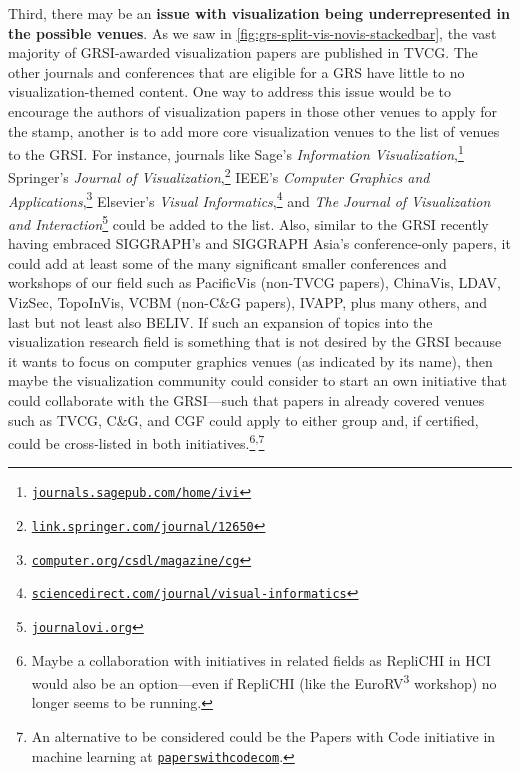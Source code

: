 \documentclass[conference,svgnames]{vgtc}                     %
\begin{document}
Third, there may be an \textbf{issue with visualization being underrepresented in the possible venues}. As we saw in \autoref{fig:grs-split-vis-novis-stackedbar}, the vast majority of GRSI-awarded visualization papers are published in TVCG. The other journals and conferences that are eligible for a GRS have little to no visualization-themed content. One way to address this issue would be to encourage the authors of visualization papers in those other venues to apply for the stamp, another is to add more core visualization venues to the list of venues to the GRSI. For instance, journals like Sage's \emph{Information Visualization},\footnote{\href{https://journals.sagepub.com/home/ivi}{\texttt{journals.sagepub.com/home/ivi}}} Springer's \emph{Journal of Visualization},\footnote{\href{https://link.springer.com/journal/12650}{\texttt{link.springer.com/journal/12650}}} IEEE's \emph{Computer Graphics and Applications},\footnote{\href{https://www.computer.org/csdl/magazine/cg}{\texttt{computer.org/csdl/magazine/cg}}} Elsevier's \emph{Visual Informatics},\footnote{\href{https://www.sciencedirect.com/journal/visual-informatics}{\texttt{sciencedirect.com/journal/visual-informatics}}} and \emph{The Journal of Visualization and Interaction}\footnote{\href{https://www.journalovi.org/}{\texttt{journalovi.org}}} could be added to the list. Also, similar to the GRSI recently having embraced SIGGRAPH's and SIGGRAPH Asia's conference-only papers, it could add at least some of the many significant smaller conferences and workshops of our field such as PacificVis (non-TVCG papers), ChinaVis, LDAV, VizSec, TopoInVis, VCBM (non-C\&G papers), IVAPP, plus many others, and last but not least also BELIV. If such an expansion of topics into the visualization research field is something that is not desired by the GRSI because it wants to focus on computer graphics venues (as indicated by its name), then maybe the visualization community could consider to start an own initiative that could collaborate with the GRSI---such that papers in already covered venues such as TVCG, C\&G, and CGF could apply to either group and, if certified, could be cross-listed in both initiatives.\footnote{Maybe a collaboration with initiatives in related fields as RepliCHI in HCI \cite{Wilson:2012:RCF,Wilson:2013:RW,Wilson:2014:RW2} would also be an option---even if RepliCHI (like the EuroRV\textsuperscript{3} workshop) no longer seems to be running.}\textsuperscript{,}\footnote{An alternative to be considered could be the Papers with Code initiative in machine learning at \href{https://paperswithcode.com/}{\texttt{paperswithcodecom}}.}
\end{document}

